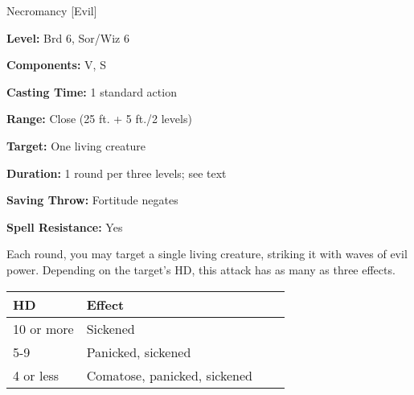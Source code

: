 
Necromancy [Evil]

\textbf{Level:} Brd 6, Sor/Wiz 6

\textbf{Components:} V, S

\textbf{Casting Time:} 1 standard action

\textbf{Range:} Close (25 ft. + 5 ft./2 levels)

\textbf{Target:} One living creature

\textbf{Duration:} 1 round per three levels; see text

\textbf{Saving Throw:} Fortitude negates

\textbf{Spell Resistance:} Yes

Each round, you may target a single living creature, striking it with waves of 
evil power. Depending on the target's HD, this attack has as many as three effects.

\begin{longtable}{llll}
\hline
\multicolumn{1}{|p{0.760in}|}{\begin{minipage}[t]{0.760in}\raggedright
\textbf{HD}\end{minipage}} & \multicolumn{1}{p{1.832in}|}{\begin{minipage}[t]{1.832in}\raggedright
\textbf{Effect}\end{minipage}}\\
\hline
\multicolumn{1}{p{0.069in}|}{\begin{minipage}[t]{0.069in}\raggedright
10 or more\end{minipage}} & \multicolumn{1}{p{0.069in}|}{\begin{minipage}[t]{0.069in}\raggedright
Sickened\end{minipage}}\\
\hline
\multicolumn{1}{|p{0.760in}|}{\begin{minipage}[t]{0.760in}\raggedright
5-9\end{minipage}} & \multicolumn{1}{p{1.832in}|}{\begin{minipage}[t]{1.832in}\raggedright
Panicked, sickened\end{minipage}}\\
\hline
\multicolumn{1}{p{0.069in}|}{\begin{minipage}[t]{0.069in}\raggedright
4 or less\end{minipage}} & \multicolumn{1}{p{0.069in}|}{\begin{minipage}[t]{0.069in}\raggedright
Comatose, panicked, sickened\end{minipage}}\\
\hline
\end{longtable}

